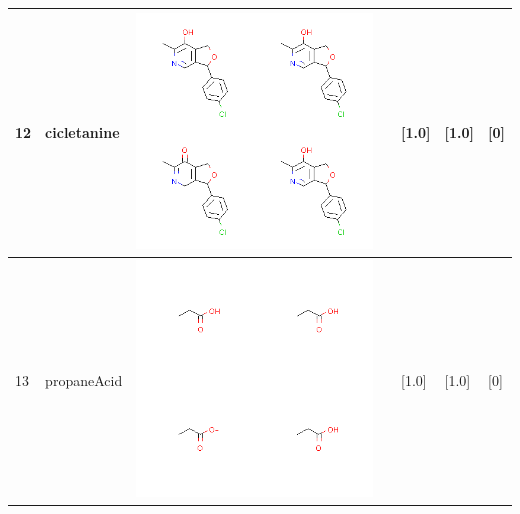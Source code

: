 \begin{longtable}{|l|l|l|l|l|l|l|}
12 & cicletanine & \includegraphics[scale=0.6]{cicletanineMV.png} & & [1.0]& [1.0] & [0] \\
\hline
13 & propaneAcid & \includegraphics[scale=0.6]{propaneAcidMV.png} & & [1.0]& [1.0] & [0] \\
\hline

\end{longtable}
